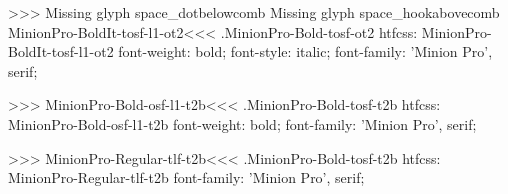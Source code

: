 {{>>>
Missing glyph	space_dotbelowcomb
Missing glyph	space_hookabovecomb
\<MinionPro-BoldIt-tosf-l1-ot2\><<<
.MinionPro-Bold-tosf-ot2
htfcss:  MinionPro-BoldIt-tosf-l1-ot2  font-weight: bold; font-style: italic; font-family: 'Minion Pro', serif;

>>>
\<MinionPro-Bold-osf-l1-t2b\><<<
.MinionPro-Bold-tosf-t2b
htfcss:  MinionPro-Bold-osf-l1-t2b  font-weight: bold; font-family: 'Minion Pro', serif;

>>>
\<MinionPro-Regular-tlf-t2b\><<<
.MinionPro-Bold-tosf-t2b
htfcss:  MinionPro-Regular-tlf-t2b  font-family: 'Minion Pro', serif;

}}
